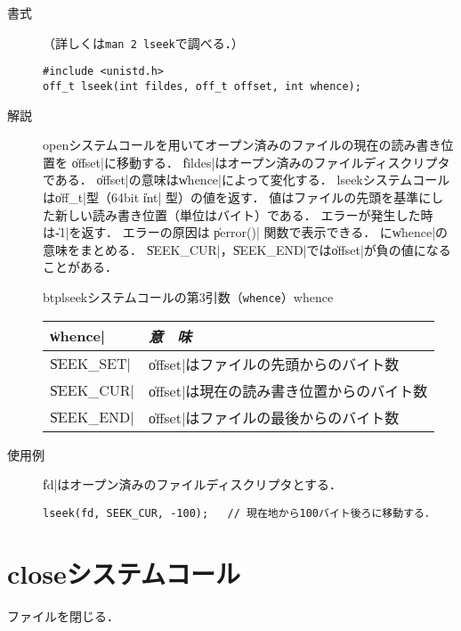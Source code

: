 \begin{description}
\item[書式]（詳しくは\texttt{man 2 lseek}で調べる．）

\begin{lstlisting}[numbers=none]
#include <unistd.h>
off_t lseek(int fildes, off_t offset, int whence);
\end{lstlisting}

\item[解説]
openシステムコールを用いてオープン済みのファイルの現在の読み書き位置を
\|offset|に移動する．
\|fildes|はオープン済みのファイルディスクリプタである．
\|offset|の意味は\|whence|によって変化する．
lseekシステムコールは\|off_t|型（64bit \|int| 型）の値を返す．
値はファイルの先頭を基準にした新しい読み書き位置（単位はバイト）である．
エラーが発生した時は\|-1|を返す．
エラーの原因は \|perror()| 関数で表示できる．
に\|whence|の意味をまとめる．
\|SEEK_CUR|，\|SEEK_END|では\|offset|が負の値になることがある．

\begin{mytable}{btp}{lseekシステムコールの第3引数（\texttt{whence}）}{whence}
\begin{tabular}{l | l}
\hline\hline
\|whence|    & \emph{意　味} \\\hline
\|SEEK_SET|  &  \|offset|はファイルの先頭からのバイト数  \\
\|SEEK_CUR|  &  \|offset|は現在の読み書き位置からのバイト数  \\
\|SEEK_END|  &  \|offset|はファイルの最後からのバイト数  \\
\end{tabular}
\end{mytable}

\item[使用例]
\|fd|はオープン済みのファイルディスクリプタとする．

\begin{lstlisting}[numbers=none]
lseek(fd, SEEK_CUR, -100);   // 現在地から100バイト後ろに移動する．
\end{lstlisting}
\end{description}

\section{closeシステムコール}

ファイルを閉じる．

